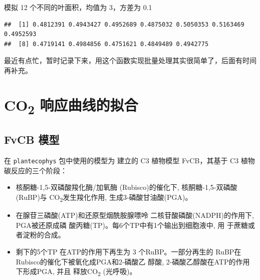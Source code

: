 \documentclass[
]{krantz}
\makeatletter
\newenvironment{Shaded}{\begin{snugshade}}{\end{snugshade}}
\newcommand{\DataTypeTok}[1]{\textcolor[rgb]{0.13,0.29,0.53}{#1}}
\newcommand{\DecValTok}[1]{\textcolor[rgb]{0.00,0.00,0.81}{#1}}
\newcommand{\FloatTok}[1]{\textcolor[rgb]{0.00,0.00,0.81}{#1}}
\newcommand{\KeywordTok}[1]{\textcolor[rgb]{0.13,0.29,0.53}{\textbf{#1}}}
\newcommand{\NormalTok}[1]{#1}
\newcommand{\OperatorTok}[1]{\textcolor[rgb]{0.81,0.36,0.00}{\textbf{#1}}}
\newcommand{\StringTok}[1]{\textcolor[rgb]{0.31,0.60,0.02}{#1}}
\newenvironment{kframe}{%
\medskip{}
\setlength{\fboxsep}{.8em}
 \def\at@end@of@kframe{}%
 \ifinner\ifhmode%
  \def\at@end@of@kframe{\end{minipage}}%
  \begin{minipage}{\columnwidth}%
 \fi\fi%
 \def\FrameCommand##1{\hskip\@totalleftmargin \hskip-\fboxsep
 \colorbox{shadecolor}{##1}\hskip-\fboxsep
     \hskip-\linewidth \hskip-\@totalleftmargin \hskip\columnwidth}%
 \MakeFramed {\advance\hsize-\width
   \@totalleftmargin\z@ \linewidth\hsize
   \@setminipage}}%
 {\par\unskip\endMakeFramed%
 \at@end@of@kframe}
\renewenvironment{Shaded}{\begin{kframe}}{\end{kframe}}
\makeatother
\begin{document}
模拟 12 个不同的叶面积，均值为 3，方差为 0.1

\begin{Shaded}
\end{Shaded}

\begin{verbatim}
##  [1] 0.4812391 0.4943427 0.4952689 0.4875032 0.5050353 0.5163469 0.4952593
##  [8] 0.4719141 0.4984856 0.4751621 0.4849489 0.4942775
\end{verbatim}

最近有点忙，暂时记录下来，用这个函数实现批量处理其实很简单了，后面有时间再补充。

\cleardoublepage

\hypertarget{response_fit}{%
\chapter{\texorpdfstring{CO\textsubscript{2} 响应曲线的拟合}{CO2 响应曲线的拟合}}\label{response_fit}}

\hypertarget{fvcb_mod}{%
\section{FvCB 模型}\label{fvcb_mod}}

在 \texttt{plantecophys} 包中使用的模型为 \citet{Farquhar1980A} 建立的 C3 植物模型 FvCB，其基于 C3 植物碳反应的三个阶段：

\begin{itemize}
\item
  核酮糖-1,5-双磷酸羧化酶/加氧酶 (Rubisco)的催化下, 核酮糖-1,5-双磷酸(RuBP)与 CO\textsubscript{2}发生羧化作用, 生成3-磷酸甘油酸(PGA)。
\item
  在腺苷三磷酸(ATP)和还原型烟酰胺腺嘌呤 二核苷酸磷酸(NADPH)的作用下, PGA被还原成磷 酸丙糖(TP)。每6个TP中有1个输出到细胞液中,
  用 于蔗糖或者淀粉的合成。
\item
  剩下的5个TP 在ATP的作用下再生为 3 个RuBP。一部分再生的 RuBP在Rubisco的催化下被氧化成PGA和2-磷酸乙 醇酸,
  2-磷酸乙醇酸在ATP的作用下形成PGA, 并且 释放CO\textsubscript{2} (光呼吸)。
\end{itemize}
\end{document}
